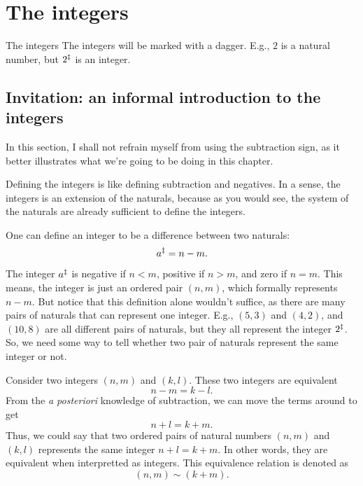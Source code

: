\chapter{The integers}

\begin{notation}{The integers}{}
  The integers will be marked with a dagger. E.g., \(2\) is a natural number, but \(2^{\ddagger}\) is an
  integer.
\end{notation}

\section{Invitation: an informal introduction to the integers}

In this section, I shall not refrain myself from using the subtraction sign, as it better
illustrates what we're going to be doing in this chapter.

Defining the integers is like defining subtraction and negatives. In a sense, the integers is an
extension of the naturals, because as you would see, the system of the naturals are already
sufficient to define the integers.

One can define an integer to be a difference between two naturals:
\begin{equation}
  a^{\ddagger} = n - m.
\end{equation}
The integer \(a^{\ddagger}\) is negative if \(n < m\), positive if \(n > m\), and zero if \(n = m\).
This means, the integer is just an ordered pair $(n, m)$, which formally represents \(n - m\). But
notice that this definition alone wouldn't suffice, as there are many pairs of naturals that can
represent one integer. E.g., $(5, 3)$ and $(4, 2)$, and \((10, 8)\) are all different pairs of
naturals, but they all represent the integer $2^{\ddagger}$. So, we need some way to tell whether two
pair of naturals represent the same integer or not.

Consider two integers $(n, m)$ and $(k, l)$. These two integers are equivalent
\ifft
\begin{equation}
  n - m = k - l.
\end{equation}
From the \emph{a posteriori} knowledge of subtraction, we can move the terms around to get
\begin{equation}
  n + l = k + m.
\end{equation}
Thus, we could say that two ordered pairs of natural numbers \((n, m)\) and \((k, l)\) represents
the same integer \ifft \(n + l = k + m\). In other words, they are equivalent when interpretted as
integers. This equivalence relation is denoted as
\begin{equation}
  (n, m) \sim (k + m).
\end{equation}

